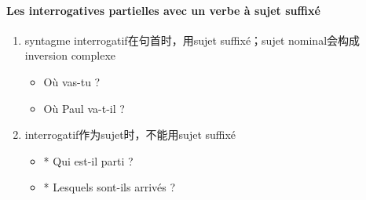 \documentclass[UTF8]{report}
\begin{document}
\paragraph{Les interrogatives partielles avec un verbe à sujet suffixé}
\begin{enumerate}
    \item syntagme interrogatif在句首时，用sujet suffixé；sujet nominal会构成 inversion complexe
    \begin{itemize}
        \item Où vas-tu ?
        \item Où Paul va-t-il ?
    \end{itemize}
    \item interrogatif作为sujet时，不能用sujet suffixé
    \begin{itemize}
        \item * Qui est-il parti ?
        \item * Lesquels sont-ils arrivés ?
    \end{itemize}
\end{enumerate}
\end{document}
